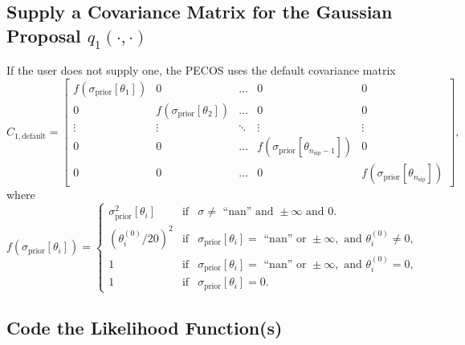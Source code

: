 \subsection{Supply a Covariance Matrix for the Gaussian Proposal $q_1(\cdot,\cdot)$}\label{subsc-gmc-eight-steps-proposal-cov-matrix-for-q1}

If the user does not supply one, the PECOS uses the default covariance matrix
\begin{equation}\label{eq-default-C1-cov-matrix}
C_{1,\text{default}} =
\left[
\begin{array}{cccccc}
f(\sigma_{\text{prior}}[\theta_1]) & 0                                  & \ldots & 0                                                   & 0      \\
0                                  & f(\sigma_{\text{prior}}[\theta_2]) & \ldots & 0                                                   & 0      \\
\vdots                             & \vdots                             & \ddots & \vdots                                              & \vdots \\
0                                  & 0                                  & \ldots & f(\sigma_{\text{prior}}[\theta_{n_{\text{sip}}-1}]) & 0      \\
0                                  & 0                                  & \ldots & 0                                                   & f(\sigma_{\text{prior}}[\theta_{n_{\text{sip}}}])
\end{array}
\right],
\end{equation}
where
\begin{equation*}
f(\sigma_{\text{prior}}[\theta_i]) =
\left\{
\begin{array}{rcl}
\sigma_{\text{prior}}^2[\theta_i] & \text{if} & \sigma\neq\text{ ``nan''}\text{ and }\pm\infty\text{ and }0.\\
(\theta_i^{(0)}/20)^2             & \text{if} & \sigma_{\text{prior}}[\theta_i] = \text{ ``nan''}\text{ or }\pm\infty,\text{ and }\theta_i^{(0)}\neq 0,\\
1                                 & \text{if} & \sigma_{\text{prior}}[\theta_i] = \text{ ``nan''}\text{ or }\pm\infty,\text{ and }\theta_i^{(0)} = 0,\\
1                                 & \text{if} & \sigma_{\text{prior}}[\theta_i] = 0.
\end{array}
\right.
\end{equation*}

\subsection{Code the Likelihood Function(s)}\label{subsc-gmc-eight-steps-likelihood-code}

